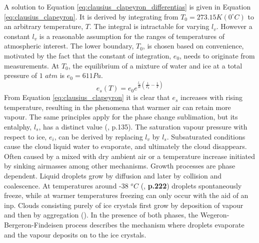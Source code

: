 A solution to Equation \eqref{eq:clausius_clapeyron_differentias} is given in Equation \eqref{eq:clausius_clapeyron}. It is derived by integrating from $T_0 = 273.15K \left(0 ^{\circ}C \right)$ to an arbitrary temperature, $T$. The integral is intractable for varying $l_v$. However a constant $l_v$ is %
a reasonable assumption for the ranges of temperatures of atmospheric interest. The lower boundary, $T_0$, is chosen based on convenience, motivated by the fact that the constant of integration,  $e_0$, needs to originate from measurements. At $T_0$, the equilibrium of a mixture of water and ice at a total pressure of $1$ $atm$ is $e_0 = 611Pa$. 
\begin{equation} \label{eq:clausius_clapeyron}
    e_s\left( T \right) = e_0 e^{\frac{l_v}{R} \left( \frac{1}{T_0} - \frac{1}{T} \right) }
\end{equation}
From Equation \eqref{eq:clausius_clapeyron} it is clear that $e_s$ increases with rising temperature, resulting in the phenomena that warmer air can retain more vapour. The same principles apply for the phase change sublimation, but its entalphy, $l_s$, has a distinct value (\cite{cloud_phys_book_johanne}, p.135). The saturation vapour pressure with respect to ice, $e_i$, can be derived by replacing $l_v$ by $l_s$. Subsaturated conditions cause the cloud liquid water to evaporate, and ultimately the cloud disappears. Often caused by a mixed with dry ambient air or a temperature increase initiated by sinking airmasses among other mechanisms.
Growth processes are phase dependent. Liquid droplets grow by diffusion and later by collision and coalescence. At temperatures around -38 $^oC$ (\cite{lohmann2016}, \textbf{p.222}) droplets spontaneously freeze, while at warmer temperatures freezing can only occur with the aid of an  \acrshort{inp}. Clouds consisting purely of ice crystals first grow by deposition of vapour and then by aggregation (\cite{Fowler1996LiquidAssumptions}). In the presence of both phases, the Wegeron-Bergeron-Findeisen process describes the mechanism where droplets evaporate and the vapour deposits on to the ice crystals. %
